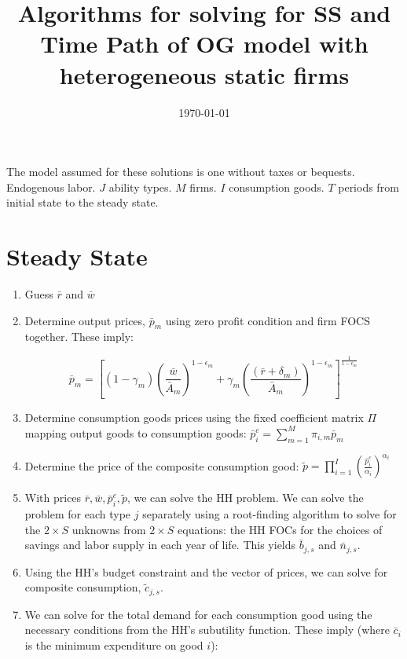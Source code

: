 \documentclass[letterpaper,12pt]{article}
\theoremstyle{definition}
\begin{document}
\title{Algorithms for solving for SS and Time Path of OG model with heterogeneous static firms}
\date{\today}
\author{}
\maketitle

\begin{spacing}{1.5}


The model assumed for these solutions is one without taxes or bequests.  Endogenous labor.  $J$ ability types.  $M$ firms.  $I$ consumption goods.  $T$ periods from initial state to the steady state.

\section{Steady State}

\begin{enumerate}
\item Guess $\bar{r}$ and $\bar{w}$
\item Determine output prices, $\bar{p}_{m}$ using zero profit condition and firm FOCS together. These imply:

\begin{equation}
\bar{p}_{m}  = \left[(1-\gamma_{m})\left(\frac{\bar{w}}{\bar{A}_{m}}\right)^{1-\epsilon_{m}} + \gamma_{m}\left(\frac{(\bar{r}+\delta_{m})}{\bar{A}_{m}}\right)^{1-\epsilon_{m}} \right]^{\frac{1}{1-\epsilon_{m}}}
\end{equation}
\item Determine consumption goods prices using the fixed coefficient matrix $\Pi$ mapping output goods to consumption goods: $\bar{p}^{c}_{i} = \sum_{m=1}^{M}\pi_{i,m}\bar{p}_{m}$
\item Determine the price of the composite consumption good: $\tilde{p} =  \prod_{i=1}^{I}\left( \frac{\bar{p}^{c}_{i}}{\alpha_{i}} \right)^{\alpha_{i}}$
\item With prices $\bar{r}, \bar{w}, \bar{p}^{c}_{i}, \tilde{p}$, we can solve the HH problem.  We can solve the problem for each type $j$ separately using a root-finding algorithm to solve for the $2\times S$ unknowns from $2\times S$ equations: the HH FOCs for the choices of savings and labor supply in each year of life.  This yields $\bar{b}_{j,s}$ and $\bar{n}_{j,s}$.
\item Using the HH's budget constraint and the vector of prices, we can solve for composite consumption, $\tilde{c}_{j,s}$.
\item We can solve for the total demand for each consumption good using the necessary conditions from the HH's subutility function.  These imply (where $\bar{c}_{i}$ is the minimum expenditure on good $i$): 


\end{enumerate}
\end{spacing}
\end{document}
